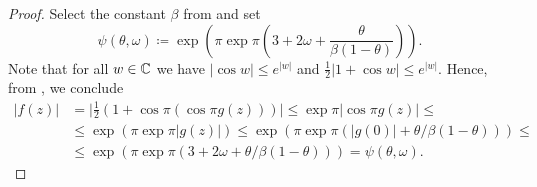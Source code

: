 \begin{proof}
    Select the constant $\beta$ from  and set
    \begin{equation*}
        \psi(\theta, \omega) \coloneqq \exp \left( \pi \exp \pi \left( 3 + 2 \omega + \frac{\theta}{\beta (1 - \theta)} \right) \right).
    \end{equation*}
    Note that for all $w \in \mathbb{C}$ we have $\vert \cos w \vert \leq e^{\vert w \vert}$ and $\frac{1}{2} \vert 1 + \cos w \vert \leq e^{\vert w \vert}$. Hence, from , we conclude
    \begin{align*}
        \vert f(z) \vert &= \vert {\textstyle \frac{1}{2}} ( 1 + \cos \pi ( \cos \pi g(z) ) ) \vert \leq \exp \pi \vert \cos \pi g(z) \vert \leq \\
        &\leq \exp ( \pi \exp \pi \vert g(z) \vert ) \leq \exp (\pi \exp \pi (\vert g(0) \vert + \theta / \beta(1 - \theta))) \leq \\
        &\leq \exp ( \pi \exp \pi ( 3 + 2 \omega + \theta / \beta(1 - \theta) ) ) = \psi(\theta, \omega).
    \end{align*}
\end{proof}